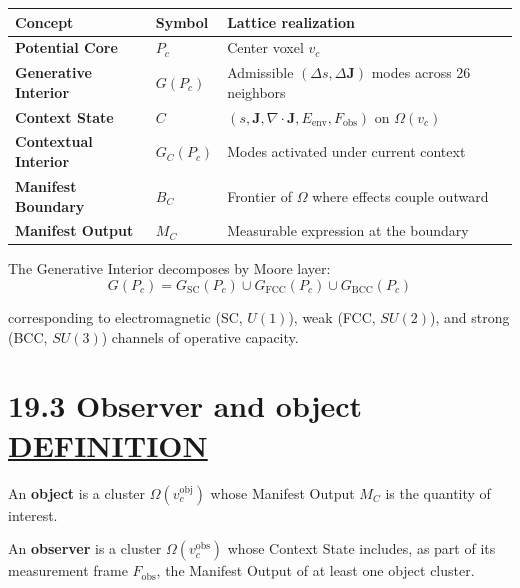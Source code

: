 \documentclass[
  11pt,
  letterpaper,
  twoside,
  openright]{book}
\begin{document}
\begin{longtable}[]{@{}
  >{\raggedright\arraybackslash}p{}
  >{\raggedright\arraybackslash}p{}
  >{\raggedright\arraybackslash}p{}@{}}
\toprule\noalign{}
\begin{minipage}[b]{\linewidth}\raggedright
Concept
\end{minipage} & \begin{minipage}[b]{\linewidth}\raggedright
Symbol
\end{minipage} & \begin{minipage}[b]{\linewidth}\raggedright
Lattice realization
\end{minipage} \\
\midrule\noalign{}
\endhead
\bottomrule\noalign{}
\endlastfoot
\textbf{Potential Core} & \(P_c\) & Center voxel \(v_c\) \\
\textbf{Generative Interior} & \(G(P_c)\) & Admissible
\((\Delta s, \Delta \mathbf{J})\) modes across 26 neighbors \\
\textbf{Context State} & \(C\) &
\((s, \mathbf{J}, \nabla \cdot \mathbf{J}, E_{\text{env}}, F_{\text{obs}})\)
on \(\Omega(v_c)\) \\
\textbf{Contextual Interior} & \(G_C(P_c)\) & Modes activated under
current context \\
\textbf{Manifest Boundary} & \(B_C\) & Frontier of \(\Omega\) where
effects couple outward \\
\textbf{Manifest Output} & \(M_C\) & Measurable expression at the
boundary \\
\end{longtable}

The Generative Interior decomposes by Moore layer: \[
G(P_c) = G_{\text{SC}}(P_c) \cup G_{\text{FCC}}(P_c) \cup G_{\text{BCC}}(P_c)
\]

corresponding to electromagnetic (SC, \(U(1)\)), weak (FCC, \(SU(2)\)),
and strong (BCC, \(SU(3)\)) channels of operative capacity.

\section{\texorpdfstring{19.3 Observer and object
\hyperref[definition]{DEFINITION}}{19.3 Observer and object DEFINITION}}\label{observer-and-object-definition}

\begin{ftddefinition}

An \textbf{object} is a cluster \(\Omega(v_c^{\text{obj}})\) whose
Manifest Output \(M_C\) is the quantity of interest.

An \textbf{observer} is a cluster \(\Omega(v_c^{\text{obs}})\) whose
Context State includes, as part of its measurement frame
\(F_{\text{obs}}\), the Manifest Output of at least one object cluster.

\end{ftddefinition}
\end{document}
